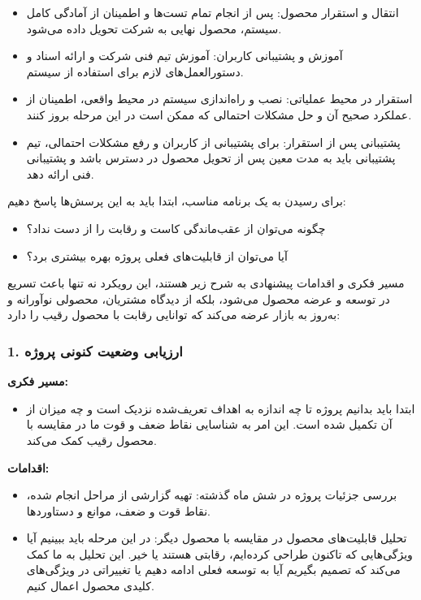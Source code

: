 \begin{itemize}
    \item 
    انتقال و استقرار محصول: پس از انجام تمام تست‌ها و اطمینان از آمادگی کامل سیستم، محصول نهایی به شرکت تحویل داده می‌شود.
    \item 
    آموزش و پشتیبانی کاربران: آموزش تیم فنی شرکت و ارائه اسناد و دستورالعمل‌های لازم برای استفاده از سیستم.
    \item 
    استقرار در محیط عملیاتی: نصب و راه‌اندازی سیستم در محیط واقعی، اطمینان از عملکرد صحیح آن و حل مشکلات احتمالی که ممکن است در این مرحله بروز کنند.
    \item 
    پشتیبانی پس از استقرار: برای پشتیبانی از کاربران و رفع مشکلات احتمالی، تیم پشتیبانی باید به مدت معین پس از تحویل محصول در دسترس باشد و پشتیبانی فنی ارائه دهد.
\end{itemize}



برای رسیدن به یک برنامه مناسب، ابتدا باید به این پرسش‌ها پاسخ دهیم:

\begin{itemize}
    \item چگونه می‌توان از عقب‌ماندگی کاست و رقابت را از دست نداد؟
    \item آیا می‌توان از قابلیت‌های فعلی پروژه بهره بیشتری برد؟
\end{itemize}
مسیر فکری و اقدامات پیشنهادی به شرح زیر هستند، این رویکرد نه تنها باعث تسریع در توسعه و عرضه محصول می‌شود، بلکه از دیدگاه مشتریان، محصولی نوآورانه و به‌روز به بازار عرضه می‌کند که توانایی رقابت با محصول رقیب را دارد:

\subsubsection*{1. ارزیابی وضعیت کنونی پروژه}

\textbf{مسیر فکری:}

\begin{itemize}
    \item ابتدا باید بدانیم پروژه تا چه اندازه به اهداف تعریف‌شده نزدیک است و چه میزان از آن تکمیل شده است. این امر به شناسایی نقاط ضعف و قوت ما در مقایسه با محصول رقیب کمک می‌کند.
\end{itemize}

\textbf{اقدامات:}

\begin{itemize}
    \item بررسی جزئیات پروژه در شش ماه گذشته: تهیه گزارشی از مراحل انجام شده، نقاط قوت و ضعف، موانع و دستاوردها.
    \item تحلیل قابلیت‌های محصول در مقایسه با محصول دیگر: در این مرحله باید ببینیم آیا ویژگی‌هایی که تاکنون طراحی کرده‌ایم، رقابتی هستند یا خیر. این تحلیل به ما کمک می‌کند که تصمیم بگیریم آیا به توسعه فعلی ادامه دهیم یا تغییراتی در ویژگی‌های کلیدی محصول اعمال کنیم.
\end{itemize}

